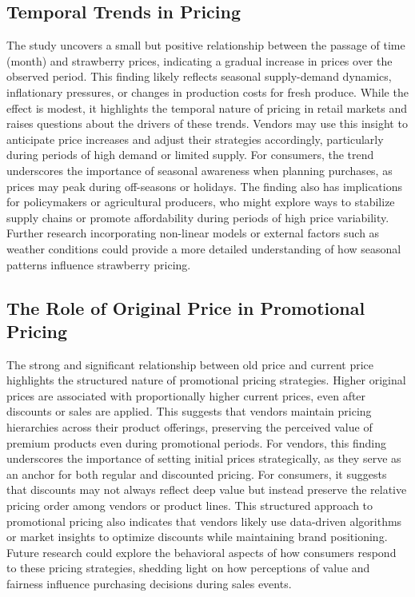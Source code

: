 \documentclass[
  letterpaper,
  DIV=11,
  numbers=noendperiod]{scrartcl}
\begin{document}
\subsection{Temporal Trends in
Pricing}\label{temporal-trends-in-pricing}

The study uncovers a small but positive relationship between the passage
of time (month) and strawberry prices, indicating a gradual increase in
prices over the observed period. This finding likely reflects seasonal
supply-demand dynamics, inflationary pressures, or changes in production
costs for fresh produce. While the effect is modest, it highlights the
temporal nature of pricing in retail markets and raises questions about
the drivers of these trends. Vendors may use this insight to anticipate
price increases and adjust their strategies accordingly, particularly
during periods of high demand or limited supply. For consumers, the
trend underscores the importance of seasonal awareness when planning
purchases, as prices may peak during off-seasons or holidays. The
finding also has implications for policymakers or agricultural
producers, who might explore ways to stabilize supply chains or promote
affordability during periods of high price variability. Further research
incorporating non-linear models or external factors such as weather
conditions could provide a more detailed understanding of how seasonal
patterns influence strawberry pricing.

\subsection{The Role of Original Price in Promotional
Pricing}\label{the-role-of-original-price-in-promotional-pricing}

The strong and significant relationship between old price and current
price highlights the structured nature of promotional pricing
strategies. Higher original prices are associated with proportionally
higher current prices, even after discounts or sales are applied. This
suggests that vendors maintain pricing hierarchies across their product
offerings, preserving the perceived value of premium products even
during promotional periods. For vendors, this finding underscores the
importance of setting initial prices strategically, as they serve as an
anchor for both regular and discounted pricing. For consumers, it
suggests that discounts may not always reflect deep value but instead
preserve the relative pricing order among vendors or product lines. This
structured approach to promotional pricing also indicates that vendors
likely use data-driven algorithms or market insights to optimize
discounts while maintaining brand positioning. Future research could
explore the behavioral aspects of how consumers respond to these pricing
strategies, shedding light on how perceptions of value and fairness
influence purchasing decisions during sales events.
\end{document}
